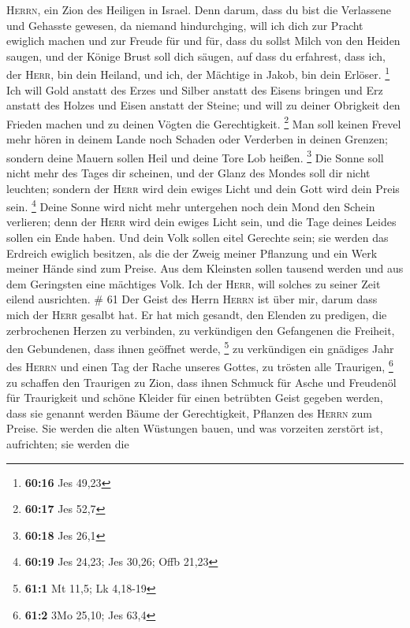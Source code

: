 \textsc{Herrn}, ein Zion des Heiligen in Israel.  Denn
darum, dass du bist die Verlassene und Gehasste gewesen, da niemand
hindurchging, will ich dich zur Pracht ewiglich machen und zur Freude
für und für,  dass du sollst Milch von den Heiden saugen,
und der Könige Brust soll dich säugen, auf dass du erfahrest, dass ich,
der \textsc{Herr}, bin dein Heiland, und ich, der Mächtige in Jakob, bin
dein Erlöser. \footnote{\textbf{60:16} Jes 49,23}  Ich
will Gold anstatt des Erzes und Silber anstatt des Eisens bringen und
Erz anstatt des Holzes und Eisen anstatt der Steine; und will zu deiner
Obrigkeit den Frieden machen und zu deinen Vögten die Gerechtigkeit.
\footnote{\textbf{60:17} Jes 52,7}  Man soll keinen
Frevel mehr hören in deinem Lande noch Schaden oder Verderben in deinen
Grenzen; sondern deine Mauern sollen Heil und deine Tore Lob heißen.
\footnote{\textbf{60:18} Jes 26,1}  Die Sonne soll nicht
mehr des Tages dir scheinen, und der Glanz des Mondes soll dir nicht
leuchten; sondern der \textsc{Herr} wird dein ewiges Licht und dein Gott
wird dein Preis sein. \footnote{\textbf{60:19} Jes 24,23; Jes 30,26;
  Offb 21,23}  Deine Sonne wird nicht mehr untergehen
noch dein Mond den Schein verlieren; denn der \textsc{Herr} wird dein
ewiges Licht sein, und die Tage deines Leides sollen ein Ende haben.
 Und dein Volk sollen eitel Gerechte sein; sie werden das
Erdreich ewiglich besitzen, als die der Zweig meiner Pflanzung und ein
Werk meiner Hände sind zum Preise.  Aus dem Kleinsten
sollen tausend werden und aus dem Geringsten eine mächtiges Volk. Ich
der \textsc{Herr}, will solches zu seiner Zeit eilend ausrichten. \# 61
 Der Geist des Herrn \textsc{Herrn} ist über mir, darum
dass mich der \textsc{Herr} gesalbt hat. Er hat mich gesandt, den
Elenden zu predigen, die zerbrochenen Herzen zu verbinden, zu
verkündigen den Gefangenen die Freiheit, den Gebundenen, dass ihnen
geöffnet werde, \footnote{\textbf{61:1} Mt 11,5; Lk 4,18-19}
 zu verkündigen ein gnädiges Jahr des \textsc{Herrn} und
einen Tag der Rache unseres Gottes, zu trösten alle Traurigen,
\footnote{\textbf{61:2} 3Mo 25,10; Jes 63,4}  zu schaffen
den Traurigen zu Zion, dass ihnen Schmuck für Asche und Freudenöl für
Traurigkeit und schöne Kleider für einen betrübten Geist gegeben werden,
dass sie genannt werden Bäume der Gerechtigkeit, Pflanzen des
\textsc{Herrn} zum Preise.  Sie werden die alten Wüstungen
bauen, und was vorzeiten zerstört ist, aufrichten; sie werden die
